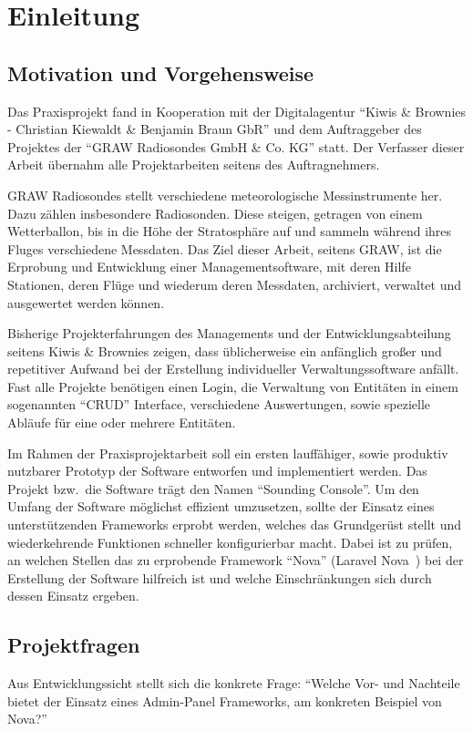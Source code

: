 \section{Einleitung}

\subsection{Motivation und Vorgehensweise}
Das Praxisprojekt fand in Kooperation mit der Digitalagentur \enquote{Kiwis \& Brownies - Christian Kiewaldt \& Benjamin Braun GbR}\cite{kiwis} und dem Auftraggeber des Projektes der \enquote{GRAW Radiosondes GmbH \& Co. KG}\cite{graw} statt.
Der Verfasser dieser Arbeit übernahm alle Projektarbeiten seitens des Auftragnehmers.

GRAW Radiosondes stellt verschiedene meteorologische Messinstrumente her.
Dazu zählen insbesondere Radiosonden.
Diese steigen, getragen von einem Wetterballon, bis in die Höhe der Stratosphäre auf und sammeln während ihres Fluges verschiedene Messdaten.
Das Ziel dieser Arbeit, seitens GRAW, ist die Erprobung und Entwicklung einer Managementsoftware, mit deren Hilfe Stationen, deren Flüge und wiederum deren Messdaten, archiviert, verwaltet und ausgewertet werden können.

Bisherige Projekterfahrungen des Managements und der Entwicklungsabteilung seitens Kiwis \& Brownies zeigen, dass üblicherweise ein anfänglich großer und repetitiver Aufwand bei der Erstellung individueller Verwaltungssoftware anfällt.
Fast alle Projekte benötigen einen Login, die Verwaltung von Entitäten in einem sogenannten \enquote{CRUD}\cite{crud} Interface, verschiedene Auswertungen, sowie spezielle Abläufe für eine oder mehrere Entitäten.

Im Rahmen der Praxisprojektarbeit soll ein ersten lauffähiger, sowie produktiv nutzbarer Prototyp der Software entworfen und implementiert werden.
Das Projekt bzw.\ die Software trägt den Namen \enquote{Sounding Console}.
Um den Umfang der Software möglichst effizient umzusetzen, sollte der Einsatz eines unterstützenden Frameworks erprobt werden, welches das Grundgerüst stellt und wiederkehrende Funktionen schneller konfigurierbar macht.
Dabei ist zu prüfen, an welchen Stellen das zu erprobende Framework \enquote{Nova} (Laravel Nova~\cite{laravel-nova}) bei der Erstellung der Software hilfreich ist und welche Einschränkungen sich durch dessen Einsatz ergeben.

\newpage

\subsection{Projektfragen}
Aus Entwicklungssicht stellt sich die konkrete Frage:
\enquote{Welche Vor- und Nachteile bietet der Einsatz eines Admin-Panel Frameworks, am konkreten Beispiel von Nova?}

